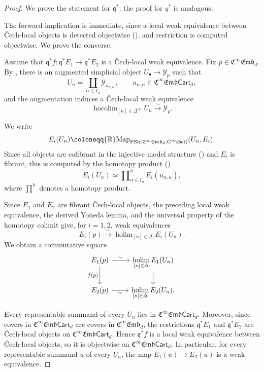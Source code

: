\documentclass{amsart}
\newcommand{\cat}[1]{\mathsf{#1}}
\newcommand{\sset}{\cat{sSet}}
\DeclareMathOperator*{\holim}{holim}
\DeclareMathOperator*{\hocolim}{hocolim}
\newcommand{\CsSet}{\textnormal{C}^{\infty}\sset}
\newcommand{\femb}[1]{\mathfrak{C}^{\infty}\mathfrak{Emb}_{#1}}
\newcommand{\fembcart}[1]{\mathfrak{C}^{\infty}\mathfrak{Emb}\cat{Cart}_{#1}}
\newcommand{\Map}{\mathrm{Map}}
\newcommand{\psh}{\mathrm{PSh}}
\newcommand{\RR}{{\mathbb{R}}}
\renewcommand{\op}{\mathrm{op}}
\newcommand{\Yo}{\mathscr{Y}}
\theoremstyle{definition}
\numberwithin{equation}{subsection}
\numberwithin{subsubsection}{subsection}
\begin{document}
\begin{proof}
  We prove the statement for \(\mathfrak{q}^{*}\); the proof for
  \(q^{*}\) is analogous.

  The forward implication is immediate, since a local weak equivalence
  between \v{C}ech-local objects is detected objectwise
  (), and restriction
  is computed objectwise. We prove the converse.

  Assume that
  \(\mathfrak{q}^{*}f:\mathfrak{q}^{*}E_{1}\to
  \mathfrak{q}^{*}E_{2}\) is a \v{C}ech-local weak equivalence. Fix
  \(p\in\femb{d}\). By
  , there is an augmented
  simplicial object \(U_{\bullet}\to\Yo_{p}\) such that
  \[
    U_{n}
    =
    \coprod_{\alpha\in I_{n}}\Yo_{u_{n,\alpha}},
    \qquad
    u_{n,\alpha}\in\fembcart{d},
  \]
  and the augmentation induces a \v{C}ech-local weak equivalence
  \[
    \hocolim_{[n]\in\Delta^{\op}}U_n
    \xrightarrow{\sim}\Yo_p.
  \]

  We write
  \[
    E_i(U_n)\coloneqq \RR\Map_{\psh(\femb{d},\CsSet)}(U_n,E_i).
  \]
  Since all objects are cofibrant in the injective model structure
  () and \(E_i\) is
  fibrant, this is computed by the homotopy product
  ()
  \[
    E_i(U_n)\simeq
    \prod\nolimits^{h}_{\alpha\in I_n}E_i(u_{n,\alpha}),
  \]
  where \(\prod\nolimits^h\) denotes a homotopy product.

  Since \(E_{1}\) and \(E_{2}\) are fibrant \v{C}ech-local objects,
  the preceding local weak equivalence, the derived Yoneda lemma, and the
  universal property of the homotopy colimit give, for \(i=1,2\), weak
  equivalences
  \[
    E_{i}(p)
    \xrightarrow{\sim}
    \holim_{[n]\in\Delta}E_{i}(U_{n}).
  \]
  We obtain a commutative square
  \[
    \begin{tikzcd}
      E_{1}(p) \arrow[r,"\sim"] \arrow[d,"f(p)"']
      & \displaystyle\holim_{[n]\in\Delta}E_{1}(U_{n}) \arrow[d] \\
      E_{2}(p) \arrow[r,"\sim"']
      & \displaystyle\holim_{[n]\in\Delta}E_{2}(U_{n}).
    \end{tikzcd}
  \]

  Every representable summand of every \(U_{n}\) lies in \(\fembcart{d}\).
  Moreover, since covers in \(\fembcart{d}\) are covers in \(\femb{d}\),
  the restrictions \(\mathfrak{q}^{*}E_{1}\) and
  \(\mathfrak{q}^{*}E_{2}\) are \v{C}ech-local objects on
  \(\fembcart{d}\). Hence \(\mathfrak{q}^{*}f\) is a local weak
  equivalence between \v{C}ech-local objects, so it is objectwise on
  \(\fembcart{d}\). In particular, for every representable summand \(u\)
  of every \(U_{n}\), the map \(E_{1}(u)\to E_{2}(u)\) is a weak
  equivalence.


\end{proof}
\end{document}
